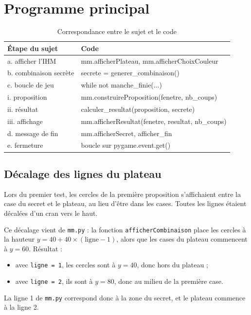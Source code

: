 \documentclass[11pt,a4paper]{article}
\begin{document}
\section{Programme principal}

\begin{table}[h]
\centering
\begin{tabular}{l >{\ttfamily}l}
\toprule
\textbf{Étape du sujet} & \textrm{\textbf{Code}} \\
\midrule
a. afficher l'IHM & mm.afficherPlateau, mm.afficherChoixCouleur \\
b. combinaison secrète & secrete = generer\_combinaison() \\
c. boucle de jeu & while not manche\_finie(...) \\
\quad i. proposition & mm.construireProposition(fenetre, nb\_coups) \\
\quad ii. résultat & calculer\_resultat(proposition, secrete) \\
\quad iii. affichage & mm.afficherResultat(fenetre, resultat, nb\_coups) \\
d. message de fin & mm.afficherSecret, afficher\_fin \\
e. fermeture & boucle sur pygame.event.get() \\
\bottomrule
\end{tabular}
\caption{Correspondance entre le sujet et le code}
\end{table}

\subsection*{Décalage des lignes du plateau}

Lors du premier test, les cercles de la première proposition s'affichaient entre la case du secret et le plateau, au lieu d'être dans les cases. Toutes les lignes étaient décalées d'un cran vers le haut.

Ce décalage vient de \texttt{mm.py} : la fonction \texttt{afficherCombinaison} place les cercles à la hauteur $y = 40 + 40 \times (\text{ligne} - 1)$, alors que les cases du plateau commencent à $y = 60$. Résultat :
\begin{itemize}
    \item avec \texttt{ligne = 1}, les cercles sont à $y = 40$, donc hors du plateau ;
    \item avec \texttt{ligne = 2}, ils sont à $y = 80$, donc au milieu de la première case.
\end{itemize}
La ligne 1 de \texttt{mm.py} correspond donc à la zone du secret, et le plateau commence à la ligne 2.
\end{document}
